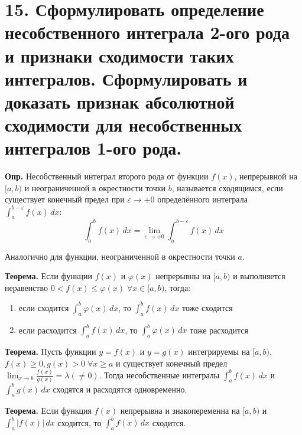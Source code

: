 \documentclass[11pt]{article}
\begin{document}
\section*{15. Сформулировать определение несобственного интеграла 2-ого рода и признаки сходимости таких интегралов. Сформулировать и доказать признак абсолютной сходимости для несобственных интегралов 1-ого рода.}
\par\textbf{Опр.} Несобственный интеграл второго рода от функции $f(x)$, непрерывной на $[a, b)$ и неограниченной в окрестности точки $b$, называется сходящимся, если существует конечный предел при $\varepsilon \to +0$ определённого интеграла $\int_{a}^{b-\varepsilon} f(x) \, dx$:$$\int_{a}^{b} f(x) \, dx = \lim_{ \varepsilon \to +0}{\int_{a}^{b - \varepsilon} f(x) \, dx }$$
\par Аналогично для функции, неограниченной в окрестности точки $a$.
\par\textbf{Теорема.} Если функции $f(x)$ и $\varphi(x)$ непрерывны на $[a, b)$ и выполняется неравенство $0 < f(x) \leq \varphi(x) \; \forall x \in [a, b)$, тогда:
\begin{enumerate}
\item если сходится $\int_{a}^{b} \varphi(x) \, dx$, то $\int_{a}^{b} f(x) \, dx$ тоже сходится
\item если расходится $\int_{a}^{b} f(x) \, dx$, то $\int_{a}^{b} \varphi(x) \, dx$ тоже расходится
\end{enumerate}
\par\textbf{Теорема.} Пусть функции $y = f(x)$ и $y = g(x)$ интегрируемы на $[a, b)$, $f(x) \geq 0, g(x) > 0 \; \forall x \geq a$ и существует конечный предел $\lim_{ x \to b }{\frac{f(x)}{g(x)}} = \lambda (\not = 0)$. Тогда несобственные интегралы $\int_{a}^{b} f(x) \, dx$ и $\int_{a}^{b} g(x) \, dx$ сходятся и расходятся одновременно.
\par\textbf{Теорема.} Если функция $f(x)$ непрерывна и знакопеременна на $[a, b)$ и $\int_{a}^{b} |f(x)| \, dx$ сходится, то $\int_{a}^{b} f(x) \, dx$ сходится.
\end{document}
